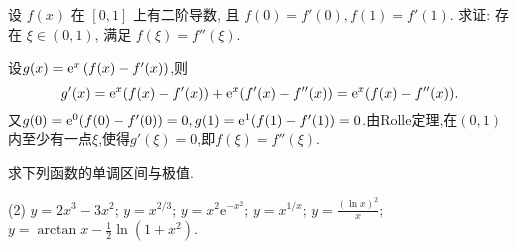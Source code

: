 \begin{exercise}[3.3.20]
    设 $f(x)$ 在 $[0,1]$ 上有二阶导数, 且 $f(0)=f'(0), f(1)=f'(1)$. 求证: 存在 $\xi \in (0,1)$, 满足 $f(\xi)=f''(\xi)$.
\end{exercise}

\begin{solution}
    设$g(x) = \mathrm{e}^x \left( f(x) - f'(x) \right)$,则
    $$
        g'(x) = \mathrm{e}^x (f(x) - f'(x)) + \mathrm{e}^x (f'(x) - f''(x)) = \mathrm{e}^x (f(x) - f''(x)).
    $$
    又$g(0) = \mathrm{e}^0 (f(0) - f'(0)) = 0, g(1) = \mathrm{e}^1 (f(1) - f'(1)) = 0$.由Rolle定理,在$(0,1)$内至少有一点$\xi$,使得$g'(\xi) = 0$,即$f(\xi) = f''(\xi)$.
\end{solution}

\begin{exercise}[3.3.21]
    求下列函数的单调区间与极值.
    \begin{tasks}[label=(\arabic*)](2)
        \task $y = 2x^3-3x^2$;
        \task $y = x^{2/3}$;
        \task $y = x^2\mathrm{e}^{-x^2}$;
        \task $y = x^{1/x}$;
        \task $y = \frac{(\ln x)^2}{x}$;
        \task $y = \arctan x - \frac{1}{2}\ln(1+x^2)$.
    \end{tasks}
\end{exercise}


